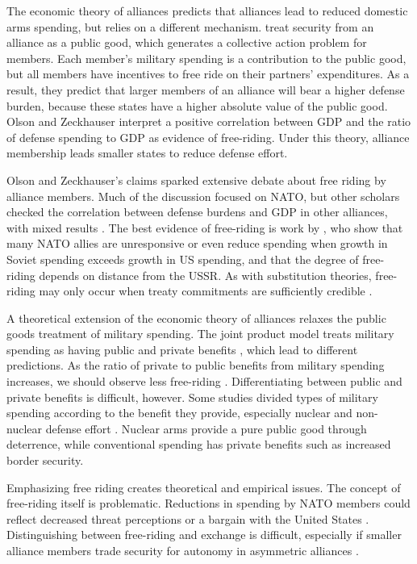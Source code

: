 \documentclass[12pt]{article}
\begin{document}
The economic theory of alliances predicts that alliances lead to reduced domestic arms spending, but relies on a different mechanism. \citet{OlsonZeckhauser1966} treat security from an alliance as a public good, which generates a collective action problem for members. Each member's military spending is a contribution to the public good, but all members have incentives to free ride on their partners' expenditures. As a result, they predict that larger members of an alliance will bear a higher defense burden, because these states have a higher absolute value of the public good. Olson and Zeckhauser interpret a positive correlation between GDP and the ratio of defense spending to GDP as evidence of free-riding. Under this theory, alliance membership leads smaller states to reduce defense effort. 

Olson and Zeckhauser's claims sparked extensive debate about free riding by alliance members. Much of the discussion focused on NATO, but other scholars checked the correlation between defense burdens and GDP in other alliances, with mixed results \citep{Reisinger1983, Thies1987, GatesTerasawa1992, OnealWhatley1996, Siroky2012}. The best evidence of free-riding is work by \citet{PluemperNeumayer2015}, who show that many NATO allies are unresponsive or even reduce spending when growth in Soviet spending exceeds growth in US spending, and that the degree of free-riding depends on distance from the USSR. As with substitution theories, free-riding may only occur when treaty commitments are sufficiently credible \citep{GatesTerasawa1992}. 

A theoretical extension of the economic theory of alliances relaxes the public goods treatment of military spending. The joint product model treats military spending as having public and private benefits \citep{ConybeareSandler1990}, which lead to different predictions. As the ratio of private to public benefits from military spending increases, we should observe less free-riding \citep{Murdoch1995, SandlerHartley2001}. Differentiating between public and private benefits is difficult, however. Some studies divided types of military spending according to the benefit they provide, especially nuclear and non-nuclear defense effort \citep{Hansenetal1990}. Nuclear arms provide a pure public good through deterrence, while conventional spending has private benefits such as increased border security. 

Emphasizing free riding creates theoretical and empirical issues. The concept of free-riding itself is problematic. Reductions in spending by NATO members could reflect decreased threat perceptions or a bargain with the United States \citep{Lanoszka2015}. Distinguishing between free-riding and exchange is difficult, especially if smaller alliance members trade security for autonomy in asymmetric alliances \citep{Morrow1991}. 
\end{document}
